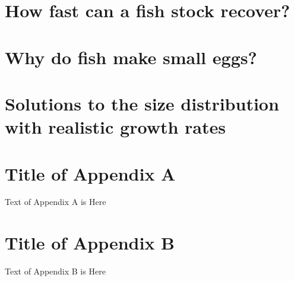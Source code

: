 \documentclass{article}
\begin{document}
\subsection{}\label{sec:Ex3A}


\section{How fast can a fish stock recover?}\label{sec:Ex4}
\subsection{}\label{sec:Ex4A}



\section{Why do fish make small eggs?}\label{sec:Ex5}
\subsection{}\label{sec:Ex5A}



\section{Solutions to the size distribution with realistic growth rates}\label{sec:Ex6}
\subsection{}\label{sec:Ex6A}

\cleardoublepage
\appendix
\section{Title of Appendix A}

Text of Appendix A is Here

\section{Title of Appendix B}

Text of Appendix B is Here
\end{document}
